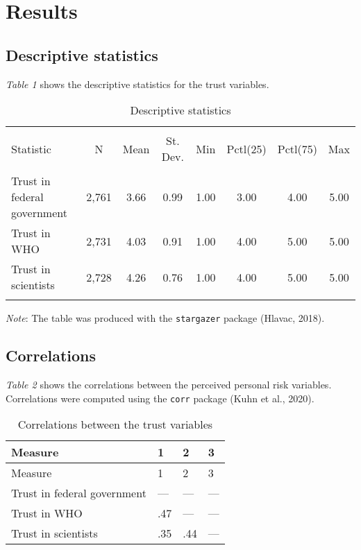 \documentclass[
]{article}
\begin{document}
\newpage

\hypertarget{results}{%
\section{Results}\label{results}}

\hypertarget{descriptive-statistics}{%
\subsection{Descriptive statistics}\label{descriptive-statistics}}

\emph{Table 1} shows the descriptive statistics for the trust variables.

\begin{table}[!htbp] \centering 
  \caption{Descriptive statistics} 
  \label{Descriptive statistics} 
\begin{tabular}{@{\extracolsep{5pt}}lccccccc} 
\\[-1.8ex]\hline 
\hline \\[-1.8ex] 
Statistic & \multicolumn{1}{c}{N} & \multicolumn{1}{c}{Mean} & \multicolumn{1}{c}{St. Dev.} & \multicolumn{1}{c}{Min} & \multicolumn{1}{c}{Pctl(25)} & \multicolumn{1}{c}{Pctl(75)} & \multicolumn{1}{c}{Max} \\ 
\hline \\[-1.8ex] 
Trust in federal government & 2,761 & 3.66 & 0.99 & 1.00 & 3.00 & 4.00 & 5.00 \\ 
Trust in WHO & 2,731 & 4.03 & 0.91 & 1.00 & 4.00 & 5.00 & 5.00 \\ 
Trust in scientists & 2,728 & 4.26 & 0.76 & 1.00 & 4.00 & 5.00 & 5.00 \\ 
\hline \\[-1.8ex] 
\end{tabular} 
\end{table}

\emph{Note}: The table was produced with the \texttt{stargazer} package
(Hlavac, 2018).

\hypertarget{correlations}{%
\subsection{Correlations}\label{correlations}}

\emph{Table 2} shows the correlations between the perceived personal
risk variables. Correlations were computed using the \texttt{corr}
package (Kuhn et al., 2020).

\begin{longtable}[]{@{}llll@{}}
\caption{Correlations between the trust variables}\tabularnewline
\toprule
Measure & 1 & 2 & 3 \\
\midrule
\endfirsthead
\toprule
Measure & 1 & 2 & 3 \\
\midrule
\endhead
Trust in federal government & --- & --- & --- \\
Trust in WHO & .47 & --- & --- \\
Trust in scientists & .35 & .44 & --- \\
\bottomrule
\end{longtable}
\end{document}
